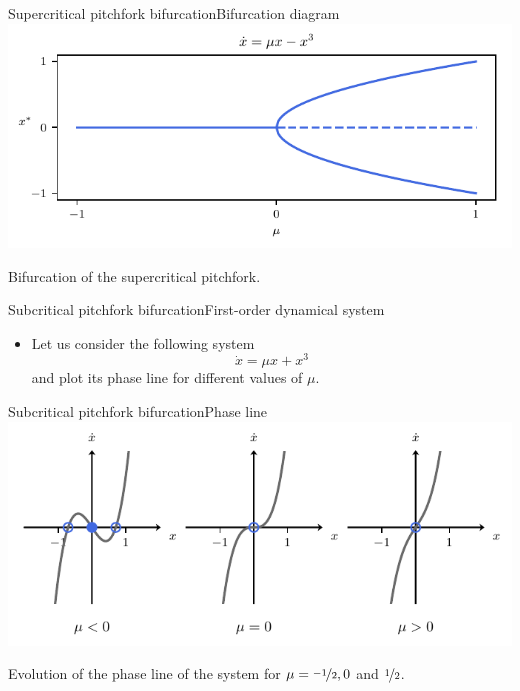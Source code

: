 \documentclass[usenames,dvipsnames,svgnames,10pt,aspectratio=169]{beamer}
\begin{document}
\begin{frame}[t, c]{Supercritical pitchfork bifurcation}{Bifurcation diagram}
	\centering
	\includegraphics[width=.75\textwidth]{supercritical_pitchfork_bifurcation_diagram}

	Bifurcation of the supercritical pitchfork.

	\vspace{1cm}
\end{frame}


\begin{frame}[t, c]{Subcritical pitchfork bifurcation}{First-order dynamical system}
	\begin{itemize}
		\item Let us consider the following system
		$$\dot{x} = \mu x + x^3$$
		and plot its phase line for different values of $\mu$.
	\end{itemize}

	\vspace{1cm}
\end{frame}

\begin{frame}[t, c]{Subcritical pitchfork bifurcation}{Phase line}
	\centering
	\includegraphics[width=.75\textwidth]{subcritical_pitchfork_phase_line}

	Evolution of the phase line of the system for $\mu = \nicefrac{-1}{2}, 0$ and $\nicefrac{1}{2}$.

	\vspace{1cm}
\end{frame}
\end{document}
